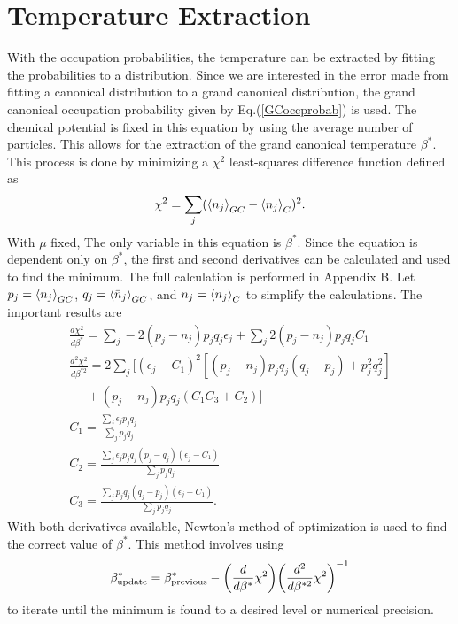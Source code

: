 \section{Temperature Extraction}
\label{section:TemperatureExtraction}
With the occupation probabilities, the temperature can be extracted by fitting the probabilities to a distribution. Since we are interested in the error made from fitting a canonical distribution to a grand canonical distribution, the grand canonical occupation probability given by Eq.\@ (\ref{GCoccprobab}) is used. The chemical potential is fixed in this equation by using the average number of particles. This allows for the extraction of the grand canonical temperature $\beta^*$. This process is done by minimizing a $\chi^2$ least-squares difference function defined as 
\begin{equation}
    \chi^2=\sum_j(\left<{n_j}\right>_{GC}-\left<{n_j}\right>_C)^2. \label{chisq}
\end{equation}
With $\mu$ fixed, The only variable in this equation is $\beta^*$. Since the equation is dependent only on $\beta^*$, the first and second derivatives can be calculated and used to find the minimum. The full calculation is performed in Appendix B. Let $p_j=\left<{n_j}\right>_{GC}$, $q_j=\left<{\bar{n}_j}\right>_{GC}$, and $n_j=\left<{n_j}\right>_C$ to simplify the calculations. The important results are 
\begin{gather}
    \frac{d\chi^2}{d\beta^*}=\sum_j -2(p_j-n_j)p_j q_j \epsilon_j+\sum_j 2(p_j-n_j)p_j q_j C_1\\
    \frac{d^2\chi^2}{d\beta^{*2}}=2\sum_j\Biggr[(\epsilon_j-C_1)^2[(p_j-n_j)p_jq_j(q_j-p_j)+p_j^2q_j^2]\nonumber\\
    \ \ \ \ \ \ +(p_j-n_j)p_jq_j(C_1C_3+C_2)\Biggr]\\
    C_1=\frac{\sum_j \epsilon_j p_j q_j}{\sum_j p_j q_j}\\
    C_2=\frac{\sum_j \epsilon_j p_j q_j(p_j - q_j)(\epsilon_j-C_1)}{\sum_j p_j q_j}\\
    C_3=\frac{\sum_j p_j q_j(q_j-p_j)(\epsilon_j-C_1)}{\sum_j p_j q_j}.
\end{gather}
With both derivatives available, Newton's method of optimization is used to find the correct value of $\beta^*$. This method involves using 
\begin{equation}
    \beta_{\text{update}}^*=\beta_{\text{previous}}^*-\qty(\frac{d}{d\beta^*}\chi^2)\qty({\frac{d^2}{d\beta^{*2}}\chi^2})^{-1}
\end{equation}
to iterate until the minimum is found to a desired level or numerical precision.

